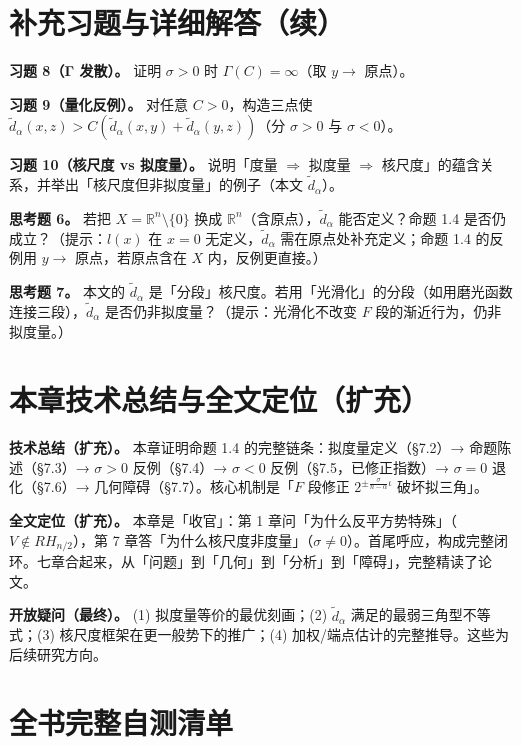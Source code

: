 \documentclass[a4paper,11pt,openany]{ctexbook}
\numberwithin{equation}{chapter}
\numberwithin{figure}{chapter}
\numberwithin{table}{chapter}
\begin{document}
\section{补充习题与详细解答（续）}

\textbf{习题 8（Γ 发散）。} 证明 $\sigma>0$ 时 $\Gamma(C)=\infty$（取 $y\to$ 原点）。

\textbf{习题 9（量化反例）。} 对任意 $C>0$，构造三点使 $\widetilde d_\alpha(x,z)>C(\widetilde d_\alpha(x,y)+\widetilde d_\alpha(y,z))$（分 $\sigma>0$ 与 $\sigma<0$）。

\textbf{习题 10（核尺度 vs 拟度量）。} 说明「度量 $\Rightarrow$ 拟度量 $\Rightarrow$ 核尺度」的蕴含关系，并举出「核尺度但非拟度量」的例子（本文 $\widetilde d_\alpha$）。

\textbf{思考题 6。} 若把 $X=\mathbb R^n\setminus\{0\}$ 换成 $\mathbb R^n$（含原点），$\widetilde d_\alpha$ 能否定义？命题 1.4 是否仍成立？（提示：$l(x)$ 在 $x=0$ 无定义，$\widetilde d_\alpha$ 需在原点处补充定义；命题 1.4 的反例用 $y\to$ 原点，若原点含在 $X$ 内，反例更直接。）

\textbf{思考题 7。} 本文的 $\widetilde d_\alpha$ 是「分段」核尺度。若用「光滑化」的分段（如用磨光函数连接三段），$\widetilde d_\alpha$ 是否仍非拟度量？（提示：光滑化不改变 $F$ 段的渐近行为，仍非拟度量。）

\section{本章技术总结与全文定位（扩充）}

\textbf{技术总结（扩充）。} 本章证明命题 1.4 的完整链条：拟度量定义（§7.2）→ 命题陈述（§7.3）→ $\sigma>0$ 反例（§7.4）→ $\sigma<0$ 反例（§7.5，已修正指数）→ $\sigma=0$ 退化（§7.6）→ 几何障碍（§7.7）。核心机制是「$F$ 段修正 $2^{\pm\frac{\sigma}{n-\alpha}\iota}$ 破坏拟三角」。

\textbf{全文定位（扩充）。} 本章是「收官」：第 1 章问「为什么反平方势特殊」（$V\notin RH_{n/2}$），第 7 章答「为什么核尺度非度量」（$\sigma\neq0$）。首尾呼应，构成完整闭环。七章合起来，从「问题」到「几何」到「分析」到「障碍」，完整精读了论文。

\textbf{开放疑问（最终）。} (1) 拟度量等价的最优刻画；(2) $\widetilde d_\alpha$ 满足的最弱三角型不等式；(3) 核尺度框架在更一般势下的推广；(4) 加权/端点估计的完整推导。这些为后续研究方向。

\section{全书完整自测清单}
\end{document}
